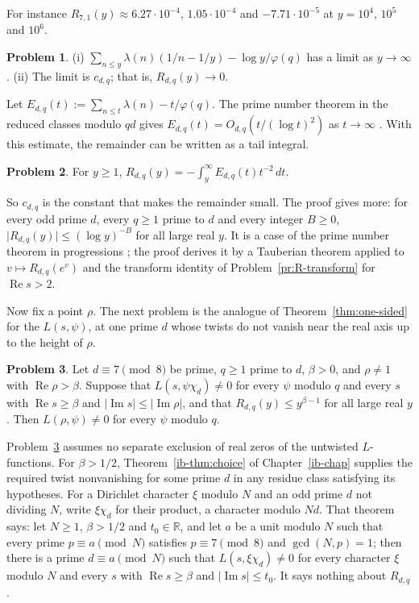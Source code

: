 \documentclass[reqno]{amsart}
\newcounter{chap}
\theoremstyle{definition}
\newtheorem{problem}{Problem}[section]
\theoremstyle{plain}
\newcommand{\R}{\mathbb{R}}
\renewcommand{\Re}{\operatorname{Re}}
\renewcommand{\Im}{\operatorname{Im}}
\begin{document}
For instance $R_{7,1}(y) \approx 6.27 \cdot 10^{-4}$, $1.05 \cdot 10^{-4}$ and $-7.71 \cdot 10^{-5}$ at $y = 10^4$, $10^5$ and $10^6$.

\begin{problem}\label{pr:R-limit}
(i) $\sum_{n \le y} \lambda(n)(1/n - 1/y) - \log y/\varphi(q)$ has a limit as $y \to \infty$.  (ii) The limit is $c_{d,q}$; that is, $R_{d,q}(y) \to 0$.
\end{problem}

Let $E_{d,q}(t) := \sum_{n \le t} \lambda(n) - t/\varphi(q)$.  The prime number theorem in the reduced classes modulo $qd$ gives $E_{d,q}(t) = O_{d,q}(t/(\log t)^2)$ as $t \to \infty$ \cite[Ch.~20]{Dav}.  With this estimate, the remainder can be written as a tail integral.

\begin{problem}\label{pr:R-tail}
For $y \ge 1$, $R_{d,q}(y) = -\int_y^\infty E_{d,q}(t)t^{-2} \, d t$.
\end{problem}

So $c_{d,q}$ is the constant that makes the remainder small.  The proof gives more: for every odd prime $d$, every $q \ge 1$ prime to $d$ and every integer $B \ge 0$, $\lvert R_{d,q}(y) \rvert \le (\log y)^{-B}$ for all large real $y$.  It is a case of the prime number theorem in progressions \cite{MV}; the proof derives it by a Tauberian theorem applied to $v \mapsto R_{d,q}(e^v)$ and the transform identity of Problem~\ref{pr:R-transform} for $\Re s > 2$.

Now fix a point $\rho$.  The next problem is the analogue of Theorem~\ref{thm:one-sided} for the $L(s, \psi)$, at one prime $d$ whose twists do not vanish near the real axis up to the height of $\rho$.

\begin{problem}\label{pr:fixed-d}
Let $d \equiv 7 \pmod 8$ be prime, $q \ge 1$ prime to $d$, $\beta > 0$, and $\rho \ne 1$ with $\Re \rho > \beta$.  Suppose that $L(s, \psi\chi_d) \ne 0$ for every $\psi$ modulo $q$ and every $s$ with $\Re s \ge \beta$ and $\lvert \Im s \rvert \le \lvert \Im \rho \rvert$, and that $R_{d,q}(y) \le y^{\beta - 1}$ for all large real $y$.  Then $L(\rho, \psi) \ne 0$ for every $\psi$ modulo $q$.
\end{problem}

Problem~\ref{pr:fixed-d} assumes no separate exclusion of real zeros of the untwisted $L$-functions.  For $\beta > 1/2$, Theorem~\ref{ib-thm:choice} of Chapter~\ref{ib-chap} supplies the required twist nonvanishing for some prime $d$ in any residue class satisfying its hypotheses.  For a Dirichlet character $\xi$ modulo $N$ and an odd prime $d$ not dividing $N$, write $\xi\chi_d$ for their product, a character modulo $Nd$.  That theorem says: let $N \ge 1$, $\beta > 1/2$ and $t_0 \in \R$, and let $a$ be a unit modulo $N$ such that every prime $p \equiv a \pmod N$ satisfies $p \equiv 7 \pmod 8$ and $\gcd(N, p) = 1$; then there is a prime $d \equiv a \pmod N$ such that $L(s, \xi\chi_d) \ne 0$ for every character $\xi$ modulo $N$ and every $s$ with $\Re s \ge \beta$ and $\lvert \Im s \rvert \le t_0$.  It says nothing about $R_{d,q}$.
\end{document}
